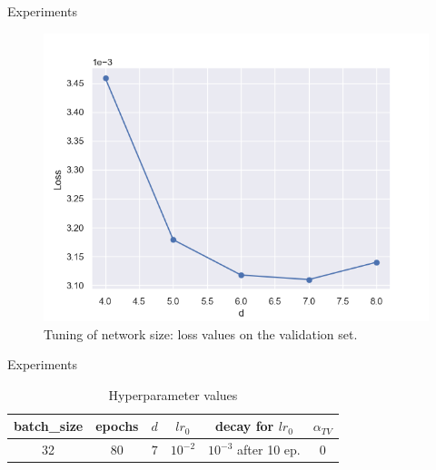 \documentclass[9pt]{beamer}
\begin{document}
\begin{frame}{Experiments}
\begin{figure}[!ht]
        \centering
        \includegraphics[width=.4\linewidth]{pics/hpp-d-8.png}
    \caption{\footnotesize Tuning of network size: loss values on the validation set.}
\end{figure}

\end{frame}
\begin{frame}{Experiments}

\begin{table}[!ht]
    \centering
    \begin{tabular}{|c|c|c|c|c|c|}
        \hline
        batch\_size & epochs & $d$ & $lr_0$ & decay for $lr_0$ & $\alpha_{TV}$ \\
        \hline
        \hline
        32 & 80 & $7$ & $10^{-2}$ & $10^{-3}$ after 10 ep. & 0 \\
        \hline
    \end{tabular}
    \caption{Hyperparameter values}
\end{table}

\end{frame}
\end{document}
